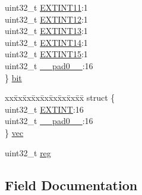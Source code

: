 \begin{DoxyCompactItemize}
\begin{tabbing}
\>uint32\_t \mbox{\hyperlink{union_e_i_c___i_n_t_e_n_s_e_t___type_a03290e3ff72e01e0ee53eeb147936f06}{EXTINT11}}:1\\
\>uint32\_t \mbox{\hyperlink{union_e_i_c___i_n_t_e_n_s_e_t___type_af93cdabb0c46c4d08aa37b6215b67b39}{EXTINT12}}:1\\
\>uint32\_t \mbox{\hyperlink{union_e_i_c___i_n_t_e_n_s_e_t___type_a6c321af7361840c15c12afdac2264958}{EXTINT13}}:1\\
\>uint32\_t \mbox{\hyperlink{union_e_i_c___i_n_t_e_n_s_e_t___type_a84fdb2f7b9284cb6a58430b20766b5a8}{EXTINT14}}:1\\
\>uint32\_t \mbox{\hyperlink{union_e_i_c___i_n_t_e_n_s_e_t___type_a16d393d8a9e76db59776627fb15fd64d}{EXTINT15}}:1\\
\>uint32\_t \mbox{\hyperlink{union_e_i_c___i_n_t_e_n_s_e_t___type_a3e57c2ef1c3ffb36722f000cc1156824}{\_\_pad0\_\_}}:16\\
\} \mbox{\hyperlink{union_e_i_c___i_n_t_e_n_s_e_t___type_a4df197da98d9403e0962cf25e02ae8b2}{bit}}\\

\end{tabbing}\item 
\begin{tabbing}
xx\=xx\=xx\=xx\=xx\=xx\=xx\=xx\=xx\=\kill
struct \{\\
\>uint32\_t \mbox{\hyperlink{union_e_i_c___i_n_t_e_n_s_e_t___type_a24c42203572180be4d02864e17e3def2}{EXTINT}}:16\\
\>uint32\_t \mbox{\hyperlink{union_e_i_c___i_n_t_e_n_s_e_t___type_a3e57c2ef1c3ffb36722f000cc1156824}{\_\_pad0\_\_}}:16\\
\} \mbox{\hyperlink{union_e_i_c___i_n_t_e_n_s_e_t___type_a481b25c88c28df5cf867363b0a6c7f2d}{vec}}\\

\end{tabbing}\item 
uint32\+\_\+t \mbox{\hyperlink{union_e_i_c___i_n_t_e_n_s_e_t___type_a6b91636401516a477989a336376d7b40}{reg}}
\end{DoxyCompactItemize}


\subsection{Field Documentation}
\mbox{\label{union_e_i_c___i_n_t_e_n_s_e_t___type_a3e57c2ef1c3ffb36722f000cc1156824}} 
